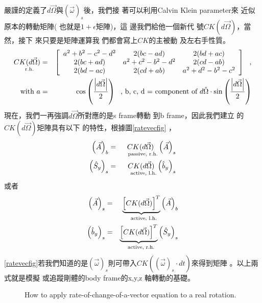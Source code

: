 \documentclass[12pt,a4paper]{article}
\begin{document}
嚴謹的定義了$d\vec{\Omega}$與$%
\left( \vec{\omega}\right) _{s}$後，我們接%
著可以利用Calvin Klein parameter來%
近似原本的轉動矩陣(%
也就是$1+\epsilon $矩陣)，這%
邊我們給他一個新代%
號$CK(d\vec{\Omega})$，當然，接下%
來只要是矩陣運算我%
們都會寫上$CK$的主被動%
及左右手性質。%
\begin{eqnarray*}
\underset{\text{r.h.}}{CK(d\vec{\Omega})} &=&\left[ 
\begin{array}{ccc}
a^{2}+b^{2}-c^{2}-d^{2} & 2(bc-ad) & 2(bd+ac) \\ 
2(bc+ad) & a^{2}+c^{2}-b^{2}-d^{2} & 2(cd-ab) \\ 
2(bd-ac) & 2(cd+ab) & a^{2}+d^{2}-b^{2}-c^{2}%
\end{array}%
\right] \text{,} \\
\text{with }a &=&\cos \left( \frac{\left\vert d\vec{\Omega}\right\vert }{2}%
\right) \text{, b, c, d = component of }d\hat{\Omega}\cdot \sin \left( \frac{%
\left\vert d\vec{\Omega}\right\vert }{2}\right)
\end{eqnarray*}%
現在，我們一再強調$d%
\vec{\Omega}$所對應的是s frame轉動%
到b frame，因此我們建立%
的$CK(d\vec{\Omega})$矩陣具有以下%
的特性，根據圖\ref{ratevecfig}%
，%
\begin{eqnarray*}
\left( \vec{A}\right) _{b} &=&\underset{\text{passive, r.h.}}{CK(d\vec{\Omega%
})}\left( \vec{A}\right) _{s} \\
\left( \hat{S}_{y}\right) _{s} &=&\underset{\text{active, l.h.}}{CK(d\vec{%
\Omega})}\left( \hat{b}_{y}\right) _{s}
\end{eqnarray*}%
或者%
\begin{eqnarray}
\left( \vec{A}\right) _{s} &=&\underset{\text{active, l.h.}}{\underbrace{%
\left[ CK(d\vec{\Omega})\right] ^{T}}}\left( \vec{A}\right) _{b}
\label{frametrans} \\
\left( \hat{b}_{y}\right) _{s} &=&\underset{\text{active, r.h.}}{\underbrace{%
\left[ CK(d\vec{\Omega})\right] ^{T}}}\left( \hat{S}_{y}\right) _{s}
\label{vecrot}
\end{eqnarray}%
\ref{ratevecfig}若我們知道的是$%
\left( \vec{\omega}\right) _{s}$則可帶入$CK(\left( 
\vec{\omega}\right) _{s}\cdot dt)$來得到矩陣%
。以上兩式就是模擬%
或追蹤剛體的body frame的x,y,z%
軸轉動的基礎。

\begin{figure}[th]
\caption{How to apply rate-of-change-of-a-vector equation to a real
rotation. }
\label{szsbtdtfig}
\begin{center}
\end{center}
\end{figure}
\end{document}

